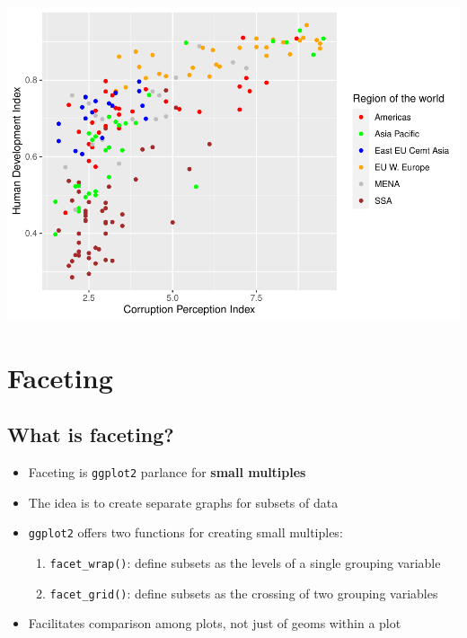 \documentclass[
]{book}
\providecommand{\tightlist}{%
  \setlength{\itemsep}{0pt}\setlength{\parskip}{0pt}}
\begin{document}
\begin{alert}
\includegraphics{R/Rgraphics/figures/unnamed-chunk-191-1.pdf}

\end{alert}

\hypertarget{faceting}{%
\section{Faceting}\label{faceting}}

\hypertarget{what-is-faceting}{%
\subsection{What is faceting?}\label{what-is-faceting}}

\begin{itemize}
\tightlist
\item
  Faceting is \texttt{ggplot2} parlance for \textbf{small multiples}
\item
  The idea is to create separate graphs for subsets of data
\item
  \texttt{ggplot2} offers two functions for creating small multiples:

  \begin{enumerate}
  \def\labelenumi{\arabic{enumi}.}
  \tightlist
  \item
    \texttt{facet\_wrap()}: define subsets as the levels of a single grouping variable
  \item
    \texttt{facet\_grid()}: define subsets as the crossing of two grouping variables
  \end{enumerate}
\item
  Facilitates comparison among plots, not just of geoms within a plot
\end{itemize}
\end{document}
